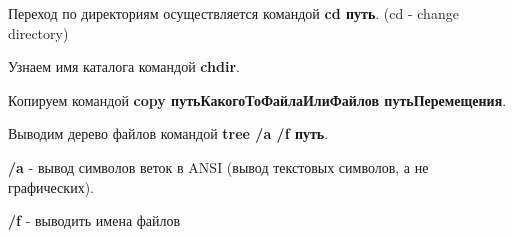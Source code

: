

Переход по директориям осуществляется командой \textbf{cd путь}. (cd - change directory)



Узнаем имя каталога командой \textbf{chdir}.





Копируем командой \textbf{copy путьКакогоТоФайлаИлиФайлов путьПеремещения}.

Выводим дерево файлов командой \textbf{tree /a /f путь}.

\textbf{/a} - вывод символов веток в ANSI (вывод текстовых символов, а не графических).

\textbf{/f} - выводить имена файлов

